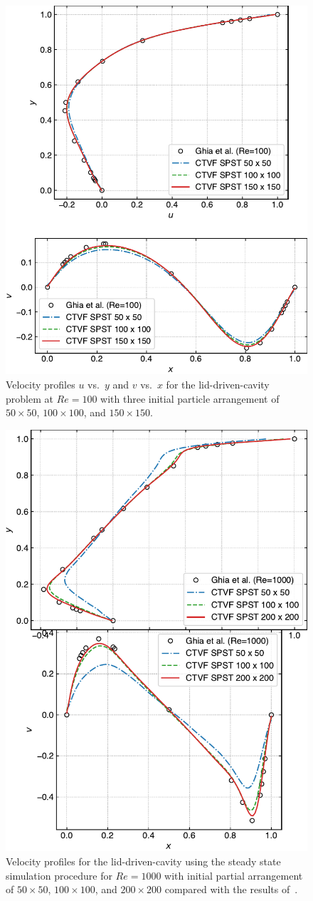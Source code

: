 %
\begin{figure}
  \centering
  \includegraphics[width=0.5\linewidth]{figures/ctvf/figures/cavity/uv_re100}
  \caption{Velocity profiles $u$ vs.\ $y$ and $v$ vs.\ $x$ for the
    lid-driven-cavity problem at $Re=100$ with three initial particle
    arrangement of $50 \times 50$, $100 \times 100$, and $150 \times
    150$.}%
  \label{fig:ldc:uv_re100}
\end{figure}
%
\begin{figure}
  \centering
  \includegraphics[width=0.5\linewidth]{figures/ctvf/figures/cavity/uv_re1000}
  \caption{Velocity profiles for the lid-driven-cavity using the steady state
    simulation procedure for $Re = 1000$ with initial partial arrangement of
    $50 \times 50$, $100 \times 100$, and $200 \times 200$ compared with
    the results of~\citep{ldc:ghia-1982}.}%
\label{fig:ldc:uv_re1000}
\end{figure}

